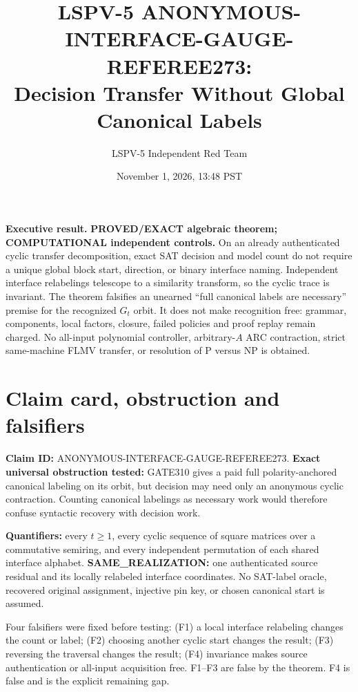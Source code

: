 \documentclass[11pt]{article}
\title{LSPV-5 ANONYMOUS-INTERFACE-GAUGE-REFEREE273:\\Decision Transfer Without Global Canonical Labels}
\author{LSPV-5 Independent Red Team}
\date{November 1, 2026, 13:48 PST}
\begin{document}
\maketitle

\noindent\textbf{Executive result.}
\textbf{PROVED/EXACT algebraic theorem; COMPUTATIONAL independent controls.}
On an already authenticated cyclic transfer decomposition, exact SAT decision and
model count do not require a unique global block start, direction, or binary
interface naming.  Independent interface relabelings telescope to a similarity
transform, so the cyclic trace is invariant.  The theorem falsifies an unearned
``full canonical labels are necessary'' premise for the recognized $G_t$ orbit.
It does not make recognition free: grammar, components, local factors, closure,
failed policies and proof replay remain charged.  No all-input polynomial
controller, arbitrary-$A$ ARC contraction, strict same-machine FLMV transfer, or
resolution of P versus NP is obtained.

\section{Claim card, obstruction and falsifiers}
\textbf{Claim ID:} ANONYMOUS-INTERFACE-GAUGE-REFEREE273.
\textbf{Exact universal obstruction tested:} GATE310 gives a paid full
polarity-anchored canonical labeling on its orbit, but decision may need only an
anonymous cyclic contraction.  Counting canonical labelings as necessary work
would therefore confuse syntactic recovery with decision work.

\textbf{Quantifiers:} every $t\ge1$, every cyclic sequence of square matrices over
a commutative semiring, and every independent permutation of each shared
interface alphabet.  \textbf{SAME\_REALIZATION:} one authenticated source residual
and its locally relabeled interface coordinates.  No SAT-label oracle, recovered
original assignment, injective pin key, or chosen canonical start is assumed.

Four falsifiers were fixed before testing: (F1) a local interface relabeling changes
the count or label; (F2) choosing another cyclic start changes the result; (F3)
reversing the traversal changes the result; (F4) invariance makes source
authentication or all-input acquisition free.  F1--F3 are false by the theorem.
F4 is false and is the explicit remaining gap.
\end{document}
